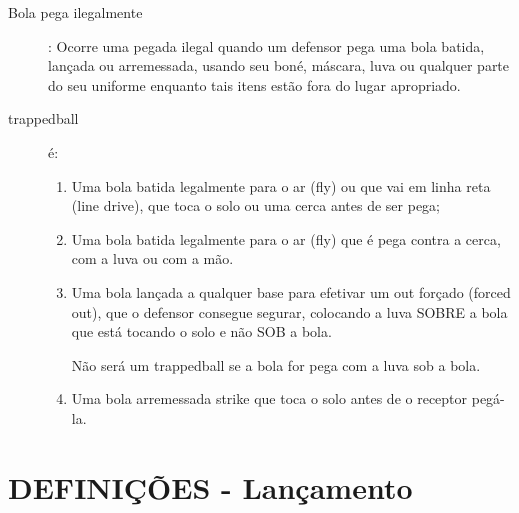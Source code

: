 \begin{description}
	\item[Bola pega ilegalmente]: Ocorre uma pegada ilegal quando um defensor pega uma bola batida, lan\c{c}ada ou arremessada, usando seu bon\'e, m\'ascara, luva ou qualquer parte do seu uniforme enquanto tais itens est\~ao fora do lugar apropriado. 

	\item[\Gls{trappedball}] \'e: 

	\begin{enumerate}[label=\alph*)]
		\item Uma bola batida legalmente para o ar (\gls{fly}) ou que vai em linha reta (\gls{line drive}), que toca o solo ou uma cerca antes de ser pega; 
		
		\item  Uma bola batida legalmente para o ar (\gls{fly}) que \'e pega contra a cerca, com a luva ou com a m\~ao. 
		
		\item  Uma bola lan\c{c}ada a qualquer base para efetivar um \gls{out} for\c{c}ado (\gls{forced out}), que o defensor consegue segurar, colocando a luva SOBRE a bola que est\'a tocando o solo e n\~ao SOB a bola. 
		
		N\~ao ser\'a um \gls{trappedball} se a bola for pega com a luva sob a bola. 
		
		\item  Uma bola arremessada \gls{strike} que toca o solo antes de o receptor peg\'a-la. 
	\end{enumerate}


	\end{description}

	\section{DEFINI\c{C}\~OES - Lan\c{c}amento}

